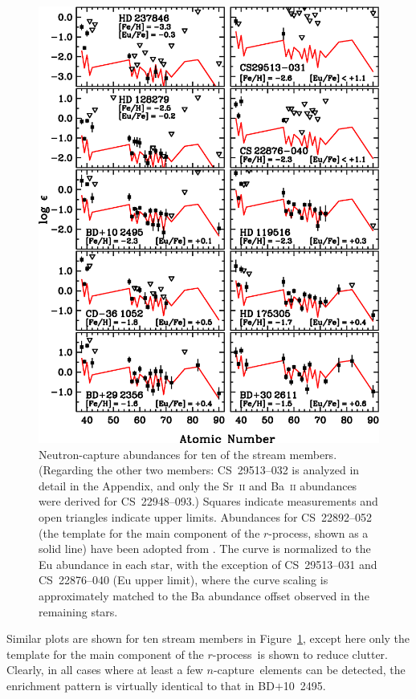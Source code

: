 \documentclass{emulateapj}
\def\rpro{\mbox{$r$-process}}
\def\ncap{\mbox{$n$-capture}}
\begin{document}
\begin{figure}
\includegraphics[angle=0,width=7.0in]{fig13.eps}
\caption{
\label{ncapplot}
Neutron-capture abundances for ten of the stream members.
(Regarding the other two members: 
\mbox{CS~29513--032} is analyzed in detail in the Appendix, and
only the Sr~\textsc{ii} and Ba~\textsc{ii} abundances
were derived for \mbox{CS~22948--093}.)
Squares indicate measurements and open triangles indicate upper limits.
Abundances for \mbox{CS~22892--052} (the template for the
main component of the \rpro, shown as a solid line) have been adopted from
\citet{sneden03a,sneden09}.
The curve is normalized to the Eu abundance in each star,
with the exception of \mbox{CS~29513--031} and \mbox{CS~22876--040}
(Eu upper limit),
where the curve
scaling is approximately matched to the Ba abundance offset
observed in the remaining stars.
}
\end{figure}


Similar plots are shown for ten stream members in Figure~\ref{ncapplot},
except here only the template for the main component of the
\rpro\ is shown to reduce clutter.
Clearly, in all cases where at least a few \ncap\ elements can be 
detected, the enrichment pattern is virtually identical to
that in \mbox{BD$+$10~2495}.
\end{document}

